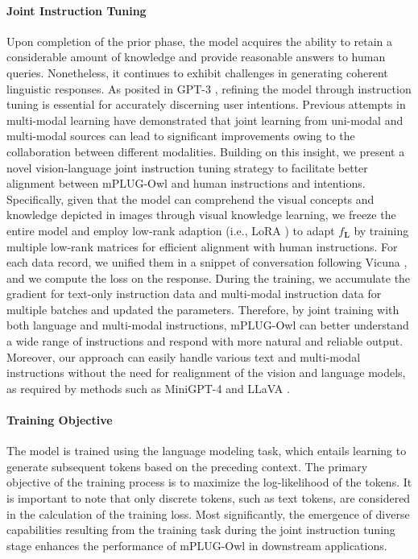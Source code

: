 \documentclass{article}
\newcommand{\modelname}{mPLUG-Owl\xspace}
\begin{document}
\paragraph{Joint Instruction Tuning}
Upon completion of the prior phase, the model acquires the ability to retain a considerable amount of knowledge and provide reasonable answers to human queries. Nonetheless, it continues to exhibit challenges in generating coherent linguistic responses. As posited in GPT-3 \citep{gpt3}, refining the model through instruction tuning is essential for accurately discerning user intentions.
Previous attempts \citep{mplug, mplug2} in multi-modal learning have demonstrated that joint learning from uni-modal and multi-modal sources can lead to significant improvements owing to the collaboration between different modalities. Building on this insight, we present a novel vision-language joint instruction tuning strategy to facilitate better alignment between \modelname and human instructions and intentions. 
Specifically, given that the model can comprehend the visual concepts and knowledge depicted in images through visual knowledge learning, we freeze the entire model and employ low-rank adaption (i.e., LoRA \citep{lora}) to adapt $f_{\mathbf{L}}$ by training multiple low-rank matrices for efficient alignment with human instructions.
For each data record, we unified them in a snippet of conversation following Vicuna \citep{vicuna}, and we compute the loss on the response. During the training, we accumulate the gradient for text-only instruction data and multi-modal instruction data for multiple batches and updated the parameters. Therefore, by joint training with both language and multi-modal instructions, \modelname can better understand a wide range of instructions and respond with more natural and reliable output. Moreover, our approach can easily handle various text and multi-modal instructions without the need for realignment of the vision and language models, as required by methods such as MiniGPT-4 \citep{minigpt4} and LLaVA \citep{llava}. 

\paragraph{Training Objective} 
The model is trained using the language modeling task, which entails learning to generate subsequent tokens based on the preceding context. The primary objective of the training process is to maximize the log-likelihood of the tokens. It is important to note that only discrete tokens, such as text tokens, are considered in the calculation of the training loss. Most significantly, the emergence of diverse capabilities resulting from the training task during the joint instruction tuning stage enhances the performance of \modelname in downstream applications.
\end{document}
